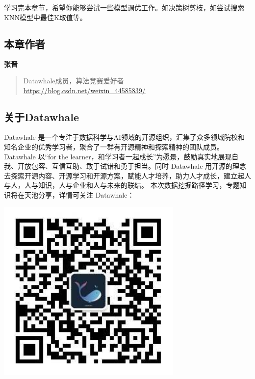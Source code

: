 \documentclass[]{ctexbook}
\begin{document}
学习完本章节，希望你能够尝试一些模型调优工作。如决策树剪枝，如尝试搜索KNN模型中最佳K取值等。

\hypertarget{ux672cux7ae0ux4f5cux8005-5}{%
\subsection*{本章作者}\label{ux672cux7ae0ux4f5cux8005-5}}


\textbf{张晋}

\begin{quote}
Datawhale成员，算法竞赛爱好者\\
\url{https://blog.csdn.net/weixin_44585839/}
\end{quote}

\hypertarget{ux5173ux4e8edatawhale-5}{%
\subsection*{关于Datawhale}\label{ux5173ux4e8edatawhale-5}}


Datawhale 是一个专注于数据科学与AI领域的开源组织，汇集了众多领域院校和知名企业的优秀学习者，聚合了一群有开源精神和探索精神的团队成员。Datawhale 以``for the learner，和学习者一起成长''为愿景，鼓励真实地展现自我、开放包容、互信互助、敢于试错和勇于担当。同时 Datawhale 用开源的理念去探索开源内容、开源学习和开源方案，赋能人才培养，助力人才成长，建立起人与人，人与知识，人与企业和人与未来的联结。 本次数据挖掘路径学习，专题知识将在天池分享，详情可关注 Datawhale：

\includegraphics[width=3.58in]{image/logo}
\end{document}
